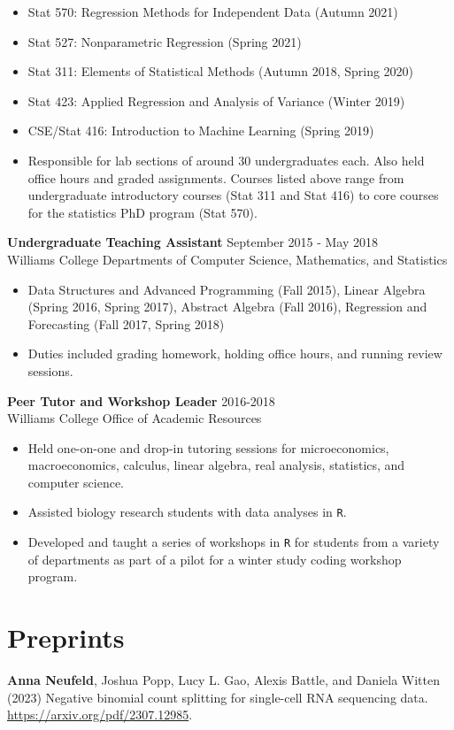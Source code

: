 \documentclass[margin, 10pt]{res}
\begin{document}
\begin{resume}
\begin{itemize}
\item Stat 570: Regression Methods for Independent Data (Autumn 2021)
\item Stat 527: Nonparametric Regression (Spring 2021)
\item Stat 311: Elements of Statistical Methods (Autumn 2018, Spring 2020)
\item Stat 423:  Applied Regression and Analysis of Variance (Winter 2019)
\item CSE/Stat 416: Introduction to Machine Learning (Spring 2019) 
\item Responsible for lab sections of around 30 undergraduates each. Also held office hours and graded assignments. Courses listed above range from undergraduate introductory courses (Stat 311 and Stat 416) to core courses for the statistics PhD program (Stat 570). 
\end{itemize}
{\textbf{Undergraduate Teaching Assistant}} \hfill September 2015 - May 2018 \\
Williams College Departments of Computer Science, Mathematics, and Statistics
\begin{itemize}
\item Data Structures and Advanced Programming (Fall 2015), Linear Algebra (Spring 2016, Spring 2017), Abstract Algebra (Fall 2016), Regression and Forecasting (Fall 2017, Spring 2018)
\item Duties included grading homework, holding office hours, and running review sessions. 
\end{itemize}
{\textbf{Peer Tutor and Workshop Leader}} \hfill 2016-2018 \\
Williams College Office of Academic Resources
\begin{itemize}
\item Held one-on-one and drop-in tutoring sessions for microeconomics, macroeconomics, calculus, linear algebra, real analysis, statistics, and computer science.  
\item Assisted biology research students with data analyses in \texttt{R}. 
\item Developed and taught a series of workshops in \texttt{R} for students from a variety of departments as part of a pilot for a winter study coding workshop program.  
\end{itemize}

\section{Preprints} 
\textbf{Anna Neufeld}, Joshua Popp, Lucy L. Gao, Alexis Battle, and Daniela Witten (2023) Negative binomial count splitting for single-cell RNA sequencing data. \\ \href{https://arxiv.org/pdf/2307.12985}{https://arxiv.org/pdf/2307.12985}. \\

\end{resume}
\end{document}
